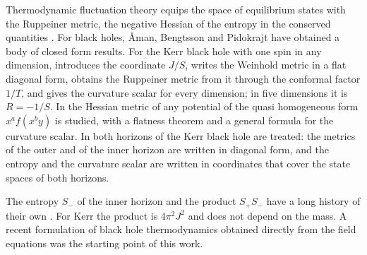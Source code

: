 \documentclass[11pt]{article}
\theoremstyle{definition}
\theoremstyle{remark}
\begin{document}
Thermodynamic fluctuation theory equips the space of equilibrium states with the Ruppeiner metric, the negative Hessian of the entropy in the conserved quantities \cite{Rup}. For black holes, {\AA}man, Bengtsson and Pidokrajt have obtained a body of closed form results. For the Kerr black hole with one spin in any dimension, \cite{AP06} introduces the coordinate $J/S$, writes the Weinhold metric in a flat diagonal form, obtains the Ruppeiner metric from it through the conformal factor $1/T$, and gives the curvature scalar for every dimension; in five dimensions it is $R=-1/S$. In \cite{ABP06} the Hessian metric of any potential of the quasi homogeneous form $x^{a}f(x^{b}y)$ is studied, with a flatness theorem and a general formula for the curvature scalar. In \cite{ABP15} both horizons of the Kerr black hole are treated: the metrics of the outer and of the inner horizon are written in diagonal form, and the entropy and the curvature scalar are written in coordinates that cover the state spaces of both horizons.

The entropy $S_{-}$ of the inner horizon and the product $S_{+}S_{-}$ have a long history of their own \cite{Curir,OK,AH,CGP,CR,CLZ}. For Kerr the product is $4\pi^{2}J^{2}$ and does not depend on the mass. A recent formulation of black hole thermodynamics obtained directly from the field equations \cite{ABJK} was the starting point of this work.
\end{document}
